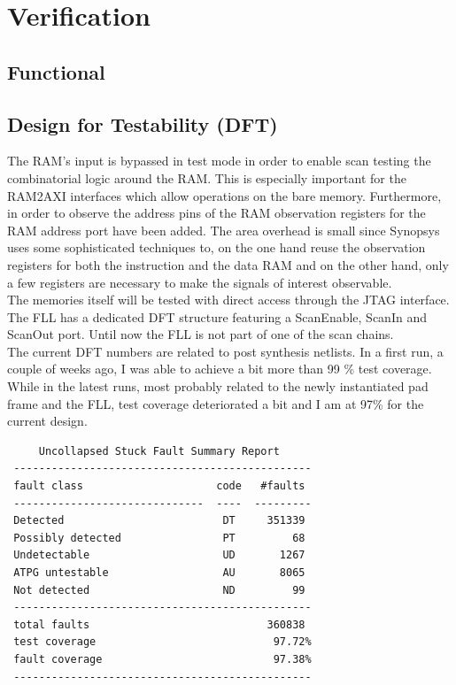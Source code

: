 \section{Verification}

\subsection{Functional}


\subsection{Design for Testability (DFT)}

The RAM's input is bypassed in test mode in order to enable scan testing the combinatorial logic around the RAM. This is especially important for the RAM2AXI interfaces which allow operations on the bare memory. Furthermore, in order to observe the address pins of the RAM observation registers for the RAM address port have been added. The area overhead is small since Synopsys uses some sophisticated techniques to, on the one hand reuse the observation registers for both the instruction and the data RAM and on the other hand, only a few registers are necessary to make the signals of interest observable. \\
The memories itself will be tested with direct access through the JTAG interface. \\
The FLL has a dedicated DFT structure featuring a ScanEnable, ScanIn and ScanOut port. Until now the FLL is not part of one of the scan chains. \\
The current DFT numbers are related to post synthesis netlists. In a first run, a couple of weeks ago, I was able to achieve a bit more than 99 \% test coverage. While in the latest runs, most probably related to the newly instantiated pad frame and the FLL, test coverage deteriorated a bit and I am at 97\% for the current design. \\


\begin{lstlisting}
     Uncollapsed Stuck Fault Summary Report
 -----------------------------------------------
 fault class                     code   #faults
 ------------------------------  ----  ---------
 Detected                         DT     351339
 Possibly detected                PT         68
 Undetectable                     UD       1267
 ATPG untestable                  AU       8065
 Not detected                     ND         99
 -----------------------------------------------
 total faults                            360838
 test coverage                            97.72%
 fault coverage                           97.38%
 -----------------------------------------------
\end{lstlisting}

